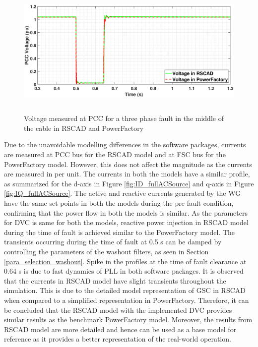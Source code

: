 \begin{figure}[H]
    \includegraphics[height = 6.5cm,width = \textwidth]{Diagrams/Chapter_3/VACP_Comp_New_4.eps}
    \caption{Voltage measured at PCC for a three phase fault in the middle of the cable in RSCAD and PowerFactory}
    \label{fig:VACP_comp}
\end{figure}

Due to the unavoidable modelling differences in the software packages, currents are measured at \gls{PCC} bus for the RSCAD model and at \gls{FSC} bus for the PowerFactory model. However, this does not affect the magnitude as the currents are measured in per unit. The currents in both the models have a similar profile, as summarized for the d-axis in Figure \ref{fig:ID_fullACSource} and q-axis in Figure \ref{fig:IQ_fullACSource}. The active and reactive currents generated by the \gls{WG} have the same set points in both the models during the pre-fault condition, confirming that the power flow in both the models is similar. As the parameters for \gls{DVC} is same for both the models, reactive power injection in RSCAD model during the time of fault is achieved similar to the PowerFactory model. The transients occurring during the time of fault at 0.5 s can be damped by controlling the parameters of the washout filters, as seen in Section \ref{para_selection_washout}. Spike in the profiles at the time of fault clearance at 0.64 s is due to fast dynamics of \gls{PLL} in both software packages. It is observed that the currents in RSCAD model have slight transients throughout the simulation. This is due to the detailed model representation of \gls{GSC} in RSCAD when compared to a simplified representation in PowerFactory. Therefore, it can be concluded that the RSCAD model with the implemented \gls{DVC} provides similar results as the benchmark PowerFactory model. Moreover, the results from RSCAD model are more detailed and hence can be used as a base model for reference as it provides a better representation of the real-world operation.  


